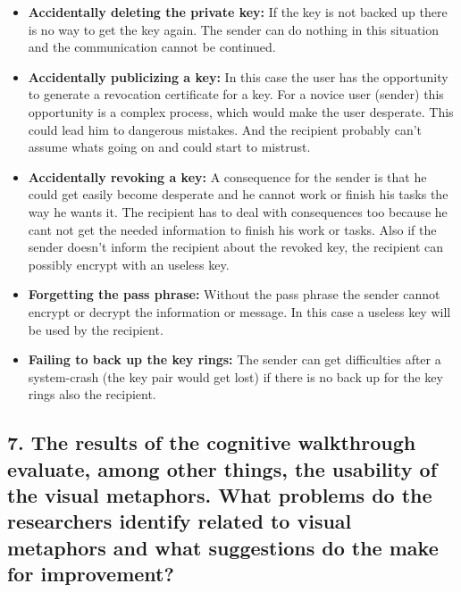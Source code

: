\begin{itemize}
	\item \textbf{Accidentally deleting the private key:}
	 If the key is not backed up there is no way to get the key again. The sender can do nothing in this situation and the communication cannot be continued.

	\item \textbf{Accidentally publicizing a key:}
	In this case the user has the opportunity to generate a revocation certificate for a key. For a novice user (sender) this opportunity is a complex process, which would make the user desperate. This could lead him to dangerous mistakes. And the recipient probably can’t assume whats going on and could start to mistrust.

	\item \textbf{Accidentally revoking a key: }
	A consequence for the sender is that he could get easily become desperate and he cannot work or finish his tasks the way he wants it. The recipient has to deal with consequences too because he cant not get the needed information to finish his work or tasks. Also if the sender doesn’t inform the recipient about the revoked key, the recipient can possibly encrypt with an useless key.

	\item \textbf{Forgetting the pass phrase:} 
	Without the pass phrase the sender cannot encrypt or decrypt the information or message. In this case a useless key will be used by  the recipient. 

	\item \textbf{Failing to back up the key rings: }
	The sender can get difficulties after a system-crash (the key pair would get lost) if there is no back up for the key rings also the recipient. 

\end{itemize}

\subsection{7. The results of the cognitive walkthrough evaluate, among other things, the usability of the visual metaphors. What problems do the researchers  identify related to visual metaphors and what suggestions do the make for improvement?}

